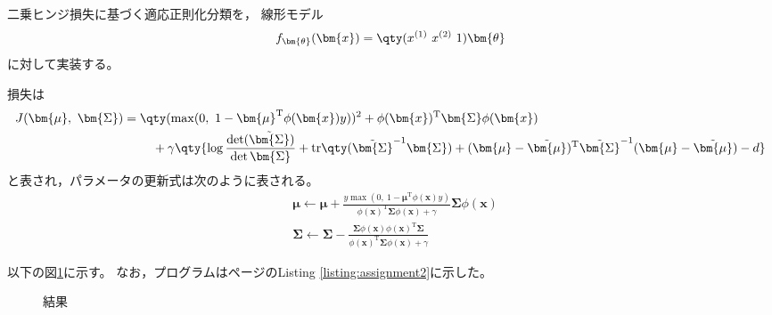\documentclass[class=jsarticle, crop=false, dvipdfmx, fleqn]{standalone}
\begin{document}
\section{}

二乗ヒンジ損失に基づく適応正則化分類を，
線形モデル
\begin{equation}
    f_{\bm{\theta}} (\bm{x}) = \qty(x^{(1)}\ x^{(2)}\ 1) \bm{\theta}
\end{equation}
に対して実装する。

損失は
\begin{align}
    J(\bm{\mu},\ \bm{\Sigma})
        & = \qty(\max(0,\ 1 - \bm{\mu}^\mathrm{T} \phi(\bm{x}) y))^2
            + \phi(\bm{x})^\mathrm{T} \bm{\Sigma} \phi(\bm{x})
            \notag \\
        & \ \qquad
            + \gamma \qty{
            \log\frac{\det(\tilde{\bm{\Sigma}})}{\det{\bm{\Sigma}}}
            + \mathrm{tr}\qty(\tilde{\bm{\Sigma}}^{-1} \bm{\Sigma})
            + (\bm{\mu} - \tilde{\bm{\mu}})^\mathrm{T} \tilde{\bm{\Sigma}}^{-1} (\bm{\mu} - \tilde{\bm{\mu}})
            - d
            }
    \label{eq:loss}
\end{align}
と表され，パラメータの更新式は次のように表される。
\begin{align}
    & \bm{\mu} \leftarrow \bm{\mu} + \frac{y \max(0,\ 1 - \bm{\mu}^\mathrm{T} \phi(\bm{x}) y)}{\phi(\bm{x})^\mathrm{T} \bm{\Sigma} \phi(\bm{x}) + \gamma} \bm{\Sigma} \phi(\bm{x}) \\
    & \bm{\Sigma} \leftarrow \bm{\Sigma} - \frac{\bm{\Sigma} \phi(\bm{x}) \phi(\bm{x})^\mathrm{T} \bm{\Sigma}}{\phi(\bm{x})^\mathrm{T} \bm{\Sigma} \phi(\bm{x}) + \gamma}
\end{align}



以下の図\ref{fig:result}に示す。
なお，プログラムは\pageref{listing:assignment2}ページのListing \ref{listing:assignment2}に示した。

\begin{figure}[H]
    \centering
    \caption{結果}
    \label{fig:result}
\end{figure}
\end{document}
